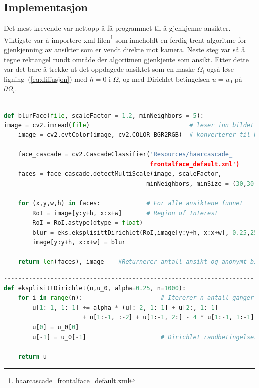 \subsection{Implementasjon}
Det mest krevende var nettopp å få programmet til å gjenkjenne ansikter. Viktigste var å importere xml-filen\footnote{haarcascade\_frontalface\_default.xml\cite{xml:haar}} som inneholdt en ferdig trent algoritme for gjenkjenning av ansikter som er vendt direkte mot kamera. Neste steg var så å tegne rektangel rundt område der algoritmen gjenkjente som ansikt. Etter dette var det bare å trekke ut det oppdagede ansiktet som en maske $\Omega_i$ også løse ligning~(\ref{eq:diffusjon}) med $h=0$ i $\Omega_i$ og med Dirichlet-betingelsen $u = u_0$ på $\partial\Omega_i$.
\begin{lstlisting}[language=Python]

def blurFace(file, scaleFactor = 1.2, minNeighbors = 5):
image = cv2.imread(file)                            # leser inn bildet BGR
    image = cv2.cvtColor(image, cv2.COLOR_BGR2RGB)  # konverterer til RGB
    
    face_cascade = cv2.CascadeClassifier('Resources/haarcascade_
                                         frontalface_default.xml') 
    faces = face_cascade.detectMultiScale(image, scaleFactor,
                                        minNeighbors, minSize = (30,30))
                                        
    for (x,y,w,h) in faces:             # For alle ansiktene funnet
        RoI = image[y:y+h, x:x+w]       # Region of Interest
        RoI = RoI.astype(dtype = float)
        blur = eks.eksplisittDirichlet(RoI,image[y:y+h, x:x+w], 0.25,250)               
        image[y:y+h, x:x+w] = blur
        
    return len(faces), image    #Returnerer antall ansikt og anonymt bilde
\end{lstlisting}

\begin{lstlisting}[language=Python]
-------------------------------------------------------------------------
def eksplisittDirichlet(u,u_0, alpha=0.25, n=1000):
    for i in range(n):                      # Itererer n antall ganger
        u[1:-1, 1:-1] += alpha * (u[:-2, 1:-1] + u[2:, 1:-1]
                      + u[1:-1, :-2] + u[1:-1, 2:] - 4 * u[1:-1, 1:-1])
        u[0] = u_0[0]  
        u[-1] = u_0[-1]                     # Dirichlet randbetingelser
        
    return u
\end{lstlisting}


